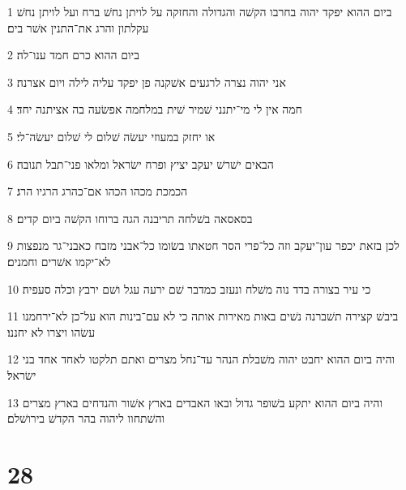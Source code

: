 \par 1 ביום ההוא יפקד יהוה בחרבו הקשׁה והגדולה והחזקה על לויתן נחשׁ ברח ועל לויתן נחשׁ עקלתון והרג את־התנין אשׁר בים׃
\par 2 ביום ההוא כרם חמד ענו־לה׃
\par 3 אני יהוה נצרה לרגעים אשׁקנה פן יפקד עליה לילה ויום אצרנה׃
\par 4 חמה אין לי מי־יתנני שׁמיר שׁית במלחמה אפשׂעה בה אציתנה יחד׃
\par 5 או יחזק במעוזי יעשׂה שׁלום לי שׁלום יעשׂה־לי׃
\par 6 הבאים ישׁרשׁ יעקב יציץ ופרח ישׂראל ומלאו פני־תבל תנובה׃
\par 7 הכמכת מכהו הכהו אם־כהרג הרגיו הרג׃
\par 8 בסאסאה בשׁלחה תריבנה הגה ברוחו הקשׁה ביום קדים׃
\par 9 לכן בזאת יכפר עון־יעקב וזה כל־פרי הסר חטאתו בשׂומו כל־אבני מזבח כאבני־גר מנפצות לא־יקמו אשׁרים וחמנים׃
\par 10 כי עיר בצורה בדד נוה משׁלח ונעזב כמדבר שׁם ירעה עגל ושׁם ירבץ וכלה סעפיה׃
\par 11 ביבשׁ קצירה תשׁברנה נשׁים באות מאירות אותה כי לא עם־בינות הוא על־כן לא־ירחמנו עשׂהו ויצרו לא יחננו׃
\par 12 והיה ביום ההוא יחבט יהוה משׁבלת הנהר עד־נחל מצרים ואתם תלקטו לאחד אחד בני ישׂראל׃
\par 13 והיה ביום ההוא יתקע בשׁופר גדול ובאו האבדים בארץ אשׁור והנדחים בארץ מצרים והשׁתחוו ליהוה בהר הקדשׁ בירושׁלם׃

\chapter{28}

